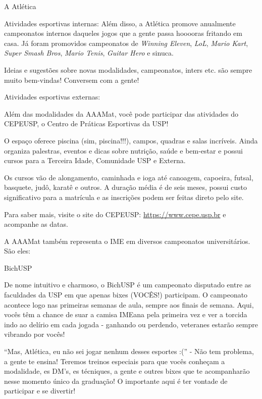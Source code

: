 \begin{secao}{A Atlética}
\begin{subsecao}{Atividades esportivas internas:}
Além disso, a Atlética promove anualmente campeonatos internos daqueles jogos
que a gente passa hooooras fritando em casa. Já foram promovidos campeonatos de
\textit{Winning Eleven}, \textit{LoL}, \textit{Mario Kart}, \textit{Super Smash Bros}, 
\textit{Mario Tenis}, \textit{Guitar Hero} e 
sinuca.

Ideias e sugestões sobre novas modalidades, campeonatos, inters etc. são
sempre muito bem-vindas! Conversem com a gente!

\end{subsecao}

\begin{subsecao}{Atividades esportivas externas:}

Além das modalidades da AAAMat, você pode participar das atividades do CEPEUSP,
o Centro de Práticas Esportivas da USP! 

O espaço oferece piscina (sim, piscina!!!), campos, quadras e salas incríveis.
Ainda organiza palestras, eventos e dicas sobre nutrição, saúde e bem-estar e 
possui cursos para a Terceira Idade, Comunidade USP e Externa. 

Os cursos vão de alongamento, caminhada e ioga até canoagem, capoeira, futsal, 
basquete, judô, karatê e outros. A duração média é de seis meses, possui custo 
significativo para a matrícula e as inscrições podem ser feitas direto pelo site. 

Para saber mais, visite o site do CEPEUSP: \url{https://www.cepe.usp.br} e acompanhe 
as datas. 

\end{subsecao}

A AAAMat também representa o IME em diversos campeonatos universitários. São
eles:

\begin{subsecao}{BichUSP}

De nome intuitivo e charmoso, o BichUSP é um campeonato disputado entre as
faculdades da USP em que apenas bixes (VOCÊS!) participam. O campeonato
acontece logo nas primeiras semanas de aula, sempre aos finais de semana. Aqui,
vocês têm a chance de suar a camisa IMEana pela primeira vez e ver a torcida
indo ao delírio em cada jogada - ganhando ou perdendo, veteranes estarão
sempre vibrando por vocês!

``Mas, Atlética, eu não sei jogar nenhum desses esportes :('' - Não tem
problema, a gente te ensina! Teremos treinos especiais para que vocês conheçam
a modalidade, es DM’s, es técniques, a gente e outres bixes que te
acompanharão nesse momento único da graduação! O importante aqui é ter vontade
de participar e se divertir!


\end{subsecao}
\end{secao}
